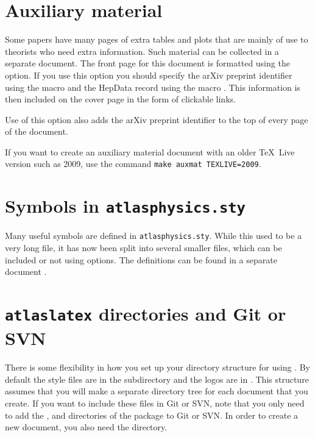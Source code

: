 \section{Auxiliary material}
\label{sec:auxmat}

Some papers have many pages of extra tables and plots that are mainly of use to theorists
who need extra information.
Such material can be collected in a separate document.
The front page for this document is formatted using the  option.
If you use this option you should specify the arXiv preprint identifier
using the macro  and the HepData record using the macro
.
This information is then included on the cover page in the form of clickable links.

Use of this option also adds the arXiv preprint identifier to the top of every page
of the document.

If you want to create an auxiliary material document with an older \TeX\ Live version such as 2009, 
use the command \texttt{make auxmat TEXLIVE=2009}.


\section{Symbols in \texttt{atlasphysics.sty}}
\label{sec:atlasphysics}

Many useful symbols are defined in \texttt{atlasphysics.sty}.
While this used to be a very long file, it has now been split into several smaller files,
which can be included or not using options.
The definitions can be found in a separate document .


\section{\texttt{atlaslatex} directories and Git or SVN}
\label{sec:gitsvn}

There is some flexibility in how you set up your directory structure for using .
By default the  style files are in the  subdirectory and the
logos are in . This structure assumes that you will make a separate directory tree
for each document that you create. If you want to include these files in Git or SVN, note that you only need to add the
,  and  directories of the  package to Git or SVN.
In order to create a new document, you also need the  directory.

